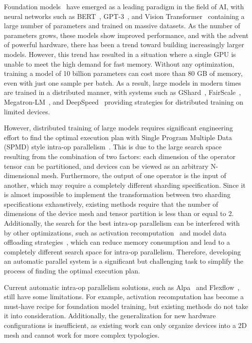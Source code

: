 Foundation models~\cite{bommasani2021opportunities} have emerged as a leading paradigm in the field of AI, with neural networks such as BERT~\cite{bert}, GPT-3~\cite{gpt-3}, and Vision Transformer~\cite{https://doi.org/10.48550/arxiv.2010.11929} containing a large number of parameters and trained on massive datasets. As the number of parameters grows, these models show improved performance, and with the advent of powerful hardware, there has been a trend toward building increasingly larger models. However, this trend has resulted in a situation where a single GPU is unable to meet the high demand for fast memory. Without any optimization, training a model of 10 billion parameters can cost more than 80 GB of memory, even with just one sample per batch. As a result, large models in modern times are trained in a distributed manner, with systems such as GShard~\cite{gshard}, FairScale~\cite{FairScale2021}, Megatron-LM~\cite{shoeybi2019megatron}, and DeepSpeed~\cite{deepspeed} providing strategies for distributed training on limited devices.

However, distributed training of large models requires significant engineering effort to find the optimal execution plan with Single Program Multiple Data (SPMD) style intra-op parallelism~\cite{xu2021gspmd}. This is due to the large search space resulting from the combination of two factors: each dimension of the operator tensor can be partitioned, and devices can be viewed as an arbitrary N-dimensional mesh. Furthermore, the output of one operator is the input of another, which may require a completely different sharding specification. Since it is almost impossible to implement the transformation between two sharding specifications exhaustively, existing methods require that the number of dimensions of the device mesh and tensor partition is less than or equal to 2. Additionally, the search for the best intra-op parallelism can be interfered with by other optimizations, such as activation recomputation~\cite{act-ckpt} and model data offloading strategies~\cite{ren2021zero, fang2022parallel}, which can reduce memory consumption and lead to a completely different search space for intra-op parallelism. Therefore, developing an automatic parallel system is a significant but challenging task to simplify the process of finding the optimal execution plan.

Current automatic intra-op parallelism solutions, such as Alpa~\cite{zheng2022alpa} and Flexflow~\cite{jia2019beyond}, still have some limitations. For example, activation recomputation has become a must-have recipe for foundation model training, but existing methods do not take it into consideration. Additionally, the generalization for new hardware configurations is insufficient, as existing work can only organize devices into a 2D mesh and cannot work for more complex typologies.

